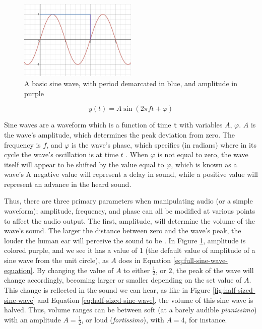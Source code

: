 \begin{figure}[H]
	\centering
	\includegraphics[width=0.5\textwidth]{figures/sine-wave-period-amplitude.png}
	\caption{A basic sine wave, with period demarcated in blue, and amplitude in purple}
	\label{fig:sine-wave-period-amplitude}
\end{figure}

\begin{equation}\label{eq:full-sine-wave-equation}
	y(t) = A \sin(2\pi ft + \varphi)
\end{equation}

Sine waves are a waveform which is a function of time \texttt{t} with variables $A$, $\varphi$. $A$ is the wave's amplitude, which determines the peak deviation from zero. The frequency is $f$, and $\varphi$ is the wave's phase, which specifies (in radians) where in its cycle the wave's oscillation is at time $t$ \cite{Kirk_Hunt_2013}. When $\varphi$ is not equal to zero, the wave itself will appear to be shifted by the value equal to $\varphi$, which is known as a wave's  A negative value will represent a delay in sound, while a positive value will represent an advance in the heard sound.

Thus, there are three primary parameters when manipulating audio (or a simple waveform); amplitude, frequency, and phase can all be modified at various points to affect the audio output. The first, amplitude, will determine the volume of the wave's sound. The larger the distance between zero and the wave's peak, the louder the human ear will perceive the sound to be \cite{Zjalic_2021}. In Figure \ref{fig:sine-wave-period-amplitude}, amplitude is colored purple, and we see it has a value of 1 (the default value of amplitude of a sine wave from the unit circle), as $A$ does in Equation \ref{eq:full-sine-wave-equation}. By changing the value of $A$ to either $\frac{1}{2}$, or $2$, the peak of the wave will change accordingly, becoming larger or smaller depending on the set value of $A$. This change is reflected in the sound we can hear, as like in Figure \ref{fig:half-sized-sine-wave} and Equation \ref{eq:half-sized-sine-wave}, the volume of this sine wave is halved. Thus, volume ranges can be between soft (at a barely audible \textit{pianissimo}) with an amplitude $A = \frac{1}{2}$, or loud (\textit{fortissimo}), with $A = 4$, for instance.

